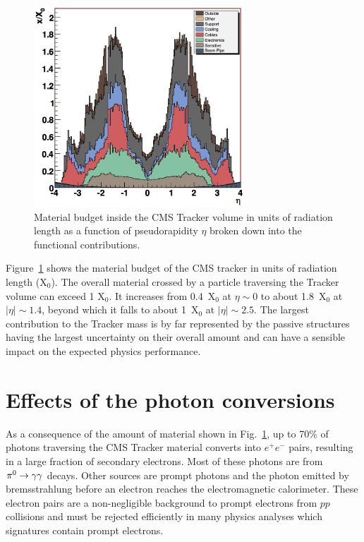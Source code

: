 \documentclass[a4paper]{jpconf}
\begin{document}
\begin{figure}[h!]
  \begin{center}
    \includegraphics[width=0.7\textwidth]{fig/trackerMaterialbudget.png}
    \caption{Material budget inside the CMS Tracker volume in units of radiation length as a function of pseudorapidity $\eta$ broken down into the functional contributions.}
    \label{fig:tkmaterial}
  \end{center}
\end{figure}



Figure~\ref{fig:tkmaterial} shows the material budget of the CMS tracker in units of radiation length (X$_0$). 
The overall material crossed by a particle traversing the Tracker volume can exceed 1 X$_0$. 
It increases from 0.4~X$_0$ at $\eta \sim 0$ to about 1.8~X$_0$ at $|\eta| \sim 1.4$, beyond which it falls to about 1~X$_0$ at $|\eta| \sim 2.5$.
The largest contribution to the Tracker mass is by far represented by the passive structures having the largest uncertainty on their overall amount and can have a sensible impact on the expected physics performance. 



\section{Effects of the photon conversions}


As a consequence  of the amount of material shown in Fig.~\ref{fig:tkmaterial}, up to 70\% of photons traversing the CMS Tracker material converts into  $e^+ e^-$ pairs, resulting in a large fraction of secondary electrons. 
Most of these photons are from ${\rm \pi^0}  \to \gamma\gamma$ decays. Other sources are prompt photons and the photon emitted by bremsstrahlung before an electron reaches the electromagnetic calorimeter. 
These electron pairs are  a non-negligible background to prompt electrons from $pp$ collisions and must be rejected efficiently in many physics analyses which signatures contain prompt electrons.
\end{document}
